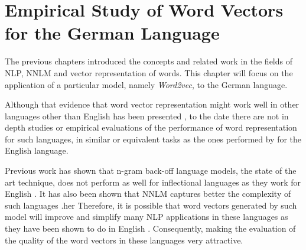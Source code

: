 \chapter{Empirical Study of Word Vectors for the German Language}
\label{chapter:wor2vec_german}











The previous chapters introduced the concepts and related work  in the fields
of  \ac{NLP}, \ac{NNLM} and vector representation of words. This chapter will
focus on the application of a particular model, namely \textit{Word2vec}, to
the German language.  


Although that  evidence that word vector representation might work
well in other languages other than English has been presented
\cite{DBLP:journals/corr/MikolovLS13}, to the date  there are not in depth studies or empirical evaluations of the
performance of word representation for such languages,  in similar or equivalent tasks as the
ones performed by \cite{DBLP:journals/corr/abs-1301-3781} for the English
language. 

Previous work has shown that  n-gram back-off language models, the state of the art
technique, does not perform  as well for inflectional  languages as they work
for English \cite{conf/icassp/MikolovKBGC09}.  It has also been shown that
\ac{NNLM} captures  better the complexity of such languages
\cite{conf/icassp/MikolovKBGC09}\cite{DBLP:journals/corr/MikolovLS13}.her
Therefore, it is possible that word vectors generated by such model  will 
improve  and simplify many \ac{NLP} applications in
these languages as they have been shown to do in
English \cite{collobert:2008} \cite{Turian:2010:WRS:1858681.1858721}.
Consequently, making the evaluation of the quality of the word vectors in
these languages very attractive.

